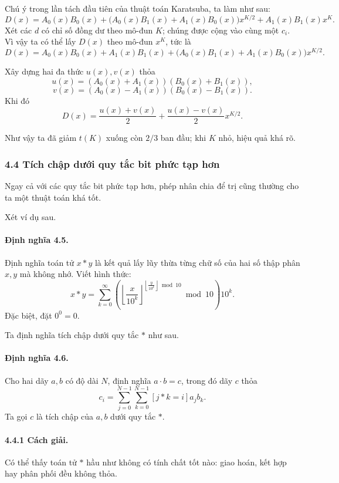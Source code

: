 \documentclass[11pt]{article}
\begin{document}
Chú ý trong lần tách đầu tiên của thuật toán Karatsuba, ta làm như sau:
\[
  D(x)=A_0(x)B_0(x)
  +\bigl(A_0(x)B_1(x)+A_1(x)B_0(x)\bigr)x^{K/2}
  +A_1(x)B_1(x)x^K .
\]
Xét các \(d\) có chỉ số đồng dư theo mô-đun \(K\); chúng được cộng vào cùng
một \(c_i\). Vì vậy ta có thể lấy \(D(x)\) theo mô-đun \(x^K\), tức là
\[
  D(x)=A_0(x)B_0(x)+A_1(x)B_1(x)
  +\bigl(A_0(x)B_1(x)+A_1(x)B_0(x)\bigr)x^{K/2}.
\]

Xây dựng hai đa thức \(u(x),v(x)\) thỏa
\[
  u(x)=(A_0(x)+A_1(x))(B_0(x)+B_1(x)),
\]
\[
  v(x)=(A_0(x)-A_1(x))(B_0(x)-B_1(x)).
\]
Khi đó
\[
  D(x)=\frac{u(x)+v(x)}{2}+\frac{u(x)-v(x)}{2}x^{K/2}.
\]

Như vậy ta đã giảm \(t(K)\) xuống còn \(2/3\) ban đầu; khi \(K\) nhỏ, hiệu quả
khá rõ.

\subsubsection*{4.4 Tích chập dưới quy tắc bit phức tạp hơn}

Ngay cả với các quy tắc bit phức tạp hơn, phép nhân chia để trị cũng thường cho
ta một thuật toán khá tốt.

Xét ví dụ sau.

\paragraph{Định nghĩa 4.5.}
Định nghĩa toán tử \(x*y\) là kết quả lấy lũy thừa từng chữ số của hai số thập
phân \(x,y\) mà không nhớ. Viết hình thức:
\[
  x*y=
  \sum_{k=0}^{\infty}
  \left(
    \left\lfloor\frac{x}{10^k}\right\rfloor^{
      \left\lfloor\frac{y}{10^k}\right\rfloor \bmod 10}
    \bmod 10
  \right)10^k.
\]
Đặc biệt, đặt \(0^0=0\).

Ta định nghĩa tích chập dưới quy tắc \(*\) như sau.

\paragraph{Định nghĩa 4.6.}
Cho hai dãy \(a,b\) có độ dài \(N\), định nghĩa \(a\cdot b=c\), trong đó dãy
\(c\) thỏa
\[
  c_i=\sum_{j=0}^{N-1}\sum_{k=0}^{N-1}[j*k=i]a_jb_k.
\]
Ta gọi \(c\) là tích chập của \(a,b\) dưới quy tắc \(*\).

\paragraph{4.4.1 Cách giải.}
Có thể thấy toán tử \(*\) hầu như không có tính chất tốt nào: giao hoán, kết
hợp hay phân phối đều không thỏa.
\end{document}
